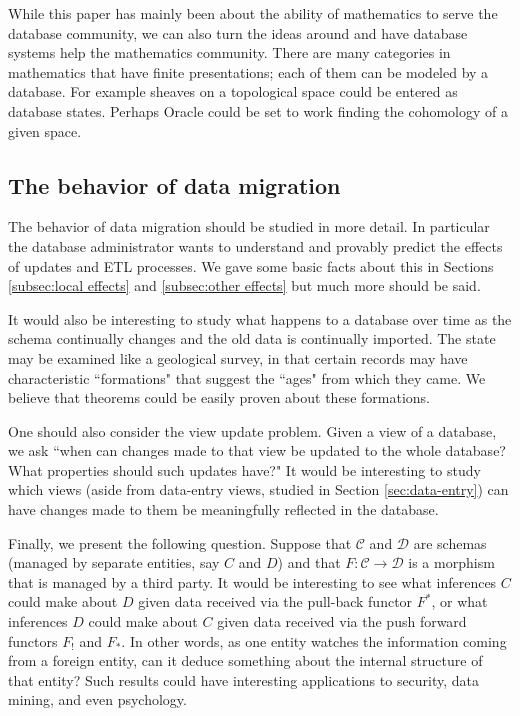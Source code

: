\documentclass{amsart}
\def\mc{\mathcal}
\def\to{\rightarrow}
\def\taking{\colon}
\def\mcC{\mc{C}}
\def\mcD{\mc{D}}
\theoremstyle{remark}
\theoremstyle{definition}
\begin{document}
While this paper has mainly been about the ability of mathematics to serve the database community, we can also turn the ideas around and have database systems help the mathematics community.  There are many categories in mathematics that have finite presentations; each of them can be modeled by a database.  For example sheaves on a topological space could be entered as database states.  Perhaps Oracle could be set to work finding the cohomology of a given space.  

\subsection{The behavior of data migration}\label{sec:future3}

The behavior of data migration should be studied in more detail.  In particular the database administrator wants to understand and provably predict the effects of updates and ETL processes.  We gave some basic facts about this in Sections \ref{subsec:local effects} and \ref{subsec:other effects} but much more should be said.

It would also be interesting to study what happens to a database over time as the schema continually changes and the old data is continually imported.  The state may be examined like a geological survey, in that certain records may have characteristic ``formations" that suggest the ``ages" from which they came.  We believe that theorems could be easily proven about these formations.

One should also consider the view update problem.  Given a view of a database, we ask ``when can changes made to that view be updated to the whole database?  What properties should such updates have?"  It would be interesting to study which views (aside from data-entry views, studied in Section \ref{sec:data-entry}) can have changes made to them be meaningfully reflected in the database.

Finally, we present the following question.  Suppose that $\mcC$ and $\mcD$ are schemas (managed by separate entities, say $C$ and $D$) and that $F\taking\mcC\to\mcD$ is a morphism that is managed by a third party.  It would be interesting to see what inferences $C$ could make about $D$ given data received via the pull-back functor $F^*$, or what inferences $D$ could make about $C$ given data received via the push forward functors $F_!$ and $F_*$.  In other words, as one entity watches the information coming from a foreign entity, can it deduce something about the internal structure of that entity?  Such results could have interesting applications to security, data mining, and even psychology.
\end{document}
